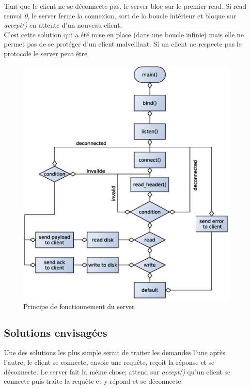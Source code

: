 \documentclass[a4paper,12pt]{article}
\begin{document}
Tant que le client ne se déconnecte pas, le server bloc sur le premier read. Si read renvoi \emph{0}, le server ferme la connexion, sort de la boucle intérieur et bloque sur \emph{accept()} en attente d'un nouveau client.\\

 C'est cette solution qui a été mise en place (dans une boucle infinie) mais elle ne permet pas de se protéger d'un client malveillant. Si un client ne respecte pas le protocole le server peut être 

\begin{figure}[H]
\begin{center}
\includegraphics[scale=.6]{imgs/schema_server}
\caption{Principe de fonctionnement du server}
\label{fig:Architecture server}
\end{center}
\end{figure}

\subsection*{Solutions envisagées}

Une des solutions les plus simple serait de traiter les demandes l'une après l'autre; le client se connecte, envoie une requête, reçoit la réponse et se déconnecte. Le server fait la même chose; attend sur \emph{accept()} qu'un client se connecte puis traite la requête et y répond et se déconnecte.\\
\end{document}
